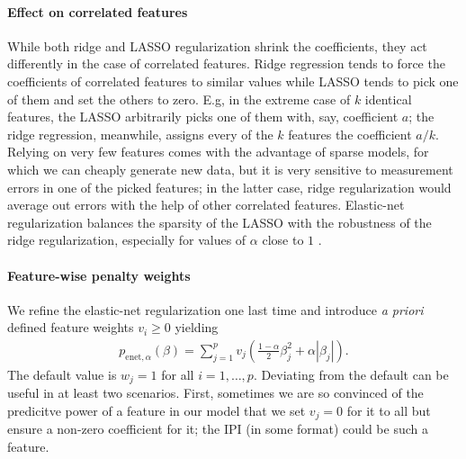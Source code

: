\paragraph{Effect on correlated features}
While both ridge and LASSO regularization shrink the coefficients, they act differently in the case 
of correlated features. Ridge regression tends to force the coefficients of correlated features to 
similar values while LASSO tends to pick one of them and set the others to zero. E.g, in the 
extreme case of $k$ identical features, the LASSO arbitrarily picks one of them with, say, 
coefficient $a$; the ridge regression, meanwhile, assigns every of the $k$ features the coefficient 
$a/k$. Relying on very few features comes with the advantage of sparse models, for which we 
can cheaply generate new data, but it is very sensitive to measurement errors in one of the picked 
features; in the latter case, ridge regularization would average out errors with the help of other 
correlated features. Elastic-net regularization balances the sparsity of the LASSO with the 
robustness of the ridge regularization, especially for values of $\alpha$ close to $1$ 
\cite{elasticnet05}.

\paragraph{Feature-wise penalty weights}
We refine the elastic-net regularization one last time and introduce \textit{a priori} defined 
feature weights $v_i \geq 0$ yielding
\begin{align}
    p_{\text{enet}, \alpha}(\beta) = \sum_{j=1}^p v_j \left( \frac{1-\alpha}{2} \beta_j^2 +
    \alpha |\beta_j| \right).
\end{align}
The default value is $w_j = 1$ for all $i = 1, \ldots, p$. Deviating from the default can be useful 
in at least two scenarios. First, sometimes we are so convinced of the predicitve 
power of a feature in our model that we set $v_j = 0$ for it to all but ensure a non-zero 
coefficient for it; the IPI (in some format) could be such a feature. 

